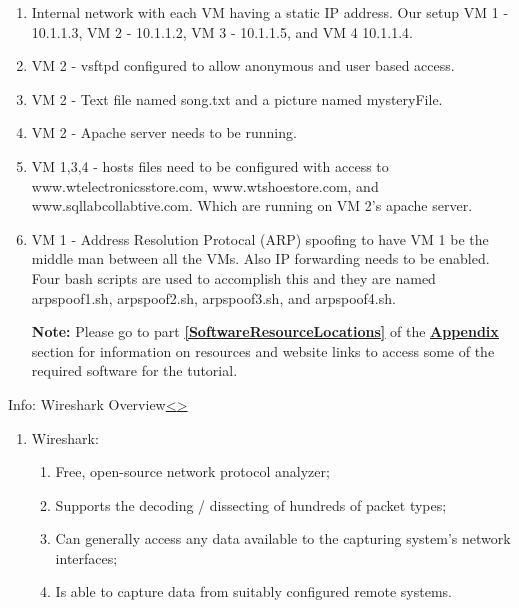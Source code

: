 \documentclass[12pt]{extarticle}
\newenvironment{instructionblock}{\Large\bgroup}{\egroup}
\newcommand{\ben}{\begin{enumerate}}
\newcommand{\een}{\end{enumerate}}
\begin{document}
	\vspace{4mm}
	\begin{enumerate}
		\item Internal network with each VM having a static IP address. Our setup VM 1 - 10.1.1.3, VM 2 - 10.1.1.2, VM 3 - 10.1.1.5, and VM 4 10.1.1.4.
		\item VM 2 - vsftpd configured to allow anonymous and user based access.
		\item VM 2 - Text file named song.txt and a picture named mysteryFile.
		\item VM 2 - Apache server needs to be running.
		\item VM 1,3,4 - hosts files need to be configured with access to www.wtelectronicsstore.com, www.wtshoestore.com, and www.sqllabcollabtive.com. Which are running on VM 2's apache server.
		\item VM 1 - Address Resolution Protocal (ARP) spoofing to have VM 1 be the middle man between all the VMs. Also IP forwarding needs to be enabled. Four bash scripts are used to accomplish this and they are named arpspoof1.sh, arpspoof2.sh, arpspoof3.sh, and arpspoof4.sh.
		
		\vfill
		\textbf{Note:} Please go to part \textbf{\underline{\ref{SoftwareResourceLocations}}} of the {\textbf{\hyperref[slide 36]{\underline{Appendix}}}} section for information on resources and website links to access some of the required software for the tutorial.
	\end{enumerate}
	
	
	
	
	\pagebreak
	\begin{slide}{Info: Wireshark Overview}{\hyperref[slide 4]{\textless}\hyperref[slide 6]{\textgreater}}
		\begin{instructionblock}
			\begin{enumerate}
				\item Wireshark:
				\ben
					\item Free, open-source network protocol analyzer;
					\item Supports the decoding / dissecting of hundreds of packet types;
					\item Can generally access any data available to the capturing system's network interfaces;
					\item Is able to capture data from suitably configured remote systems.
				\een
			\end{enumerate}
		\end{instructionblock}
	\end{slide}
	\vspace{4mm}
	
\end{document}
